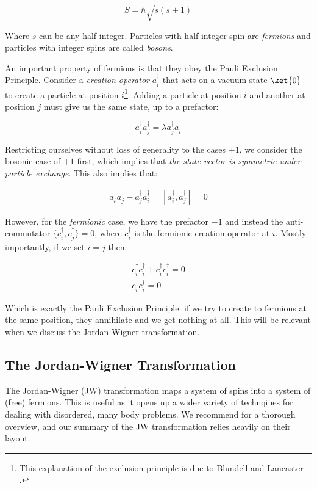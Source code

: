 \begin{equation}\label{eq:spin_number}
	S = \hbar \sqrt{s(s + 1)}
\end{equation}

Where $s$ can be any half-integer. Particles with half-integer spin are \textit{fermions} and particles with integer spins are called \textit{bosons}.

An important property of fermions is that they obey the Pauli Exclusion Principle\cite{pauli_nobel}. Consider a \textit{creation operator} $a_i^\dagger$ that acts on a vacuum state $\ket{0}$ to create a particle at position $i$\footnote{This explanation of the exclusion principle is due to Blundell and Lancaster \cite{blundell_qft}.}. Adding a particle at position $i$ and another at position $j$ must give us the same state, up to a prefactor:

\begin{equation}
	a_i^\dagger a_j^\dagger = \lambda a_j^\dagger a_i^\dagger
\end{equation}

Restricting ourselves without loss of generality to the cases $\pm1$, we consider the bosonic case of $+1$ first, which implies that \textit{the state vector is symmetric under particle exchange}. This also implies that:

\begin{gather}
	a_i^\dagger a_j^\dagger - a_j^\dagger a_i^\dagger = [a_i^\dagger, a_j^\dagger] = 0
\end{gather}

However, for the \textit{fermionic} case, we have the prefactor $-1$ and instead the anti-commutator $\{c_i^\dagger, c_j^\dagger\} = 0$, where $c_i^\dagger$ is the fermionic creation operator at $i$. Mostly importantly, if we set $i = j$ then:

\begin{gather}
	c_i^\dagger c_i^\dagger + c_i^\dagger c_i^\dagger = 0 \\
	c_i^\dagger c_i^\dagger = 0
\end{gather}

Which is exactly the Pauli Exclusion Principle: if we try to create to fermions at the same position, they annihilate and we get nothing at all. This will be relevant when we discuss the Jordan-Wigner transformation.


\subsection{The Jordan-Wigner Transformation}
The Jordan-Wigner (JW) transformation maps a system of spins into a system of (free) fermions. This is useful as it opens up a wider variety of technqiues for dealing with disordered, many body problems. We recommend \cite{quantum_ising_beginners} for a thorough overview, and our summary of the JW transformation relies heavily on their layout. 

